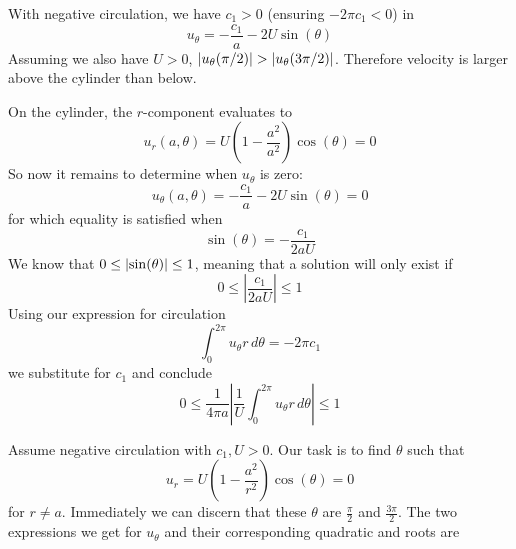 \documentclass[a4paper]{article}
\begin{document}
\vspace{12pt}


With negative circulation, we have \( c_{1} > 0 \) (ensuring \( -2 \pi c_{1} < 0 \)) in 
\[
	u_{\theta} = -\frac{c_{1}}{a} - 2U \sin\!\left(\theta\right) 
\]
Assuming we also have \( U > 0 \), \( \abs{u_{\theta}\!\left( \pi / 2 \right)} > \abs{u_{\theta}\!\left( 3 \pi / 2 \right)} \). Therefore velocity is larger above the cylinder than below.

\vspace{12pt}


On the cylinder, the \( r \)-component evaluates to
\[
	u_{r}\!\left( a,\theta \right) = U \!\left( 1 - \frac{a^{2}}{a^{2}} \right)\cos\!\left(\theta\right) = 0
\]
So now it remains to determine when \( u_{\theta} \) is zero:
\[
	u_{\theta}\!\left( a,\theta \right) = -\frac{c_{1}}{a} - 2U \sin\!\left(\theta\right) = 0
\]
for which equality is satisfied when 
\[
	\sin\!\left(\theta\right) = -\frac{c_{1}}{2aU}
\]
We know that \( 0 \le \abs{\sin\!\left(\theta\right)} \le 1 \), meaning that a solution will only exist if 
\[
	0 \le \!\left| \frac{c_{1}}{2aU} \right| \le 1 
\]
Using our expression for circulation
\[
	\int^{2 \pi}_{0} u_{\theta}r \, d \theta = -2 \pi c_{1} 
\]
we substitute for \( c_{1} \) and conclude
\[
	0 \le \frac{1}{4 \pi a}\!\left| \frac{1}{U}\int^{2 \pi}_{0} u_{\theta}r \, d \theta \right| \le 1
\]

\newpage

Assume negative circulation with \( c_{1}, U > 0 \). Our task is to find \( \theta \) such that
\[
	u_{r} = U \!\left( 1 - \frac{a^{2}}{r^{2}} \right)\cos\!\left(\theta\right) = 0
\]
for \( r \neq a \). Immediately we can discern that these \( \theta \) are \( \displaystyle{\frac{\pi}{2}} \) and \( \displaystyle{\frac{3 \pi}{2}} \). The two expressions we get for \( u_{\theta} \) and their corresponding quadratic and roots are
\end{document}
